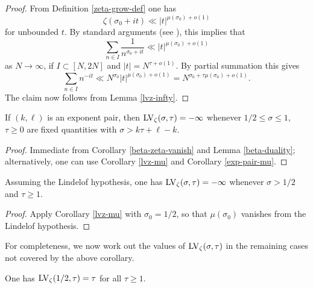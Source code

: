\begin{proof} From Definition \ref{zeta-grow-def} one has
    $$ \zeta(\sigma_0 + it) \ll |t|^{\mu(\sigma_0) + o(1)}$$
    for unbounded $t$.  By standard arguments (see \cite[(8.13)]{ivic}), this implies that
    $$ \sum_{n \in I} \frac{1}{n^{\sigma_0+it}} \ll |t|^{\mu(\sigma_0) + o(1)}$$
    as $N \to \infty$, if $I \subset [N,2N]$ and $|t| = N^{\tau+o(1)}$.  By partial summation this gives
    $$ \sum_{n \in I} n^{-it} \ll N^{\sigma_0} |t|^{\mu(\sigma_0) + o(1)} = N^{\sigma_0 + \tau \mu(\sigma_0) + o(1)}.$$
    The claim now follows from Lemma \ref{lvz-infty}.
\end{proof}

\begin{corollary}\label{lvz-exp} If $(k,\ell)$ is an exponent pair, then $\mathrm{LV}_\zeta(\sigma,\tau) = -\infty$ whenever $1/2 \leq \sigma \leq 1$, $\tau \geq 0$ are fixed quantities with $\sigma > k \tau + \ell - k$.
\end{corollary}

\begin{proof} Immediate from Corollary \ref{beta-zeta-vanish} and Lemma \ref{beta-duality}; alternatively, one can use Corollary \ref{lvz-mu} and Corollary \ref{exp-pair-mu}.
\end{proof}


\begin{corollary}\label{lh-vanish} Assuming the Lindelof hypothesis, one has $\mathrm{LV}_\zeta(\sigma,\tau) = -\infty$ whenever $\sigma > 1/2$ and $\tau \geq 1$.
\end{corollary}

\begin{proof} Apply Corollary \ref{lvz-mu} with $\sigma_0=1/2$, so that $\mu(\sigma_0)$ vanishes from the Lindelof hypothesis.
\end{proof}

For completeness, we now work out the values of $\mathrm{LV}_\zeta(\sigma,\tau)$ in the remaining cases not covered by the above corollary.

\begin{lemma}[Value at $\sigma=1/2$]\label{lvz-2} One has $\mathrm{LV}_\zeta(1/2,\tau) = \tau$ for all $\tau \geq 1$.
\end{lemma}


